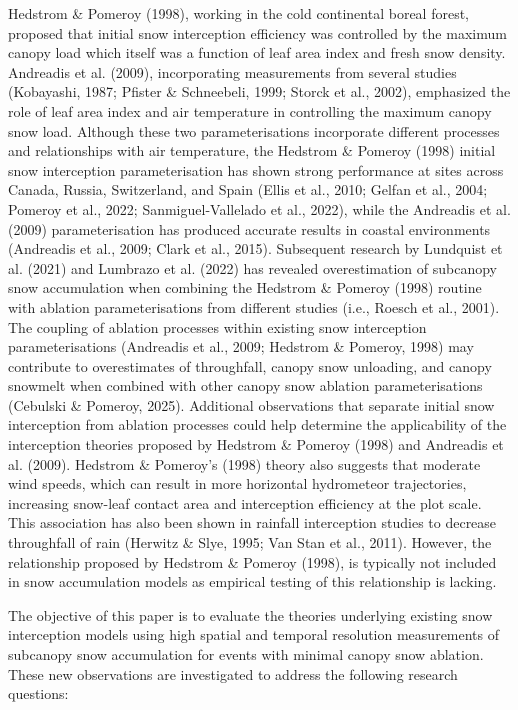 \documentclass[
  letterpaper,
  DIV=11,
  numbers=noendperiod]{scrartcl}
\begin{document}
Hedstrom \& Pomeroy (1998), working in the cold continental boreal
forest, proposed that initial snow interception efficiency was
controlled by the maximum canopy load which itself was a function of
leaf area index and fresh snow density. Andreadis et al. (2009),
incorporating measurements from several studies (Kobayashi, 1987;
Pfister \& Schneebeli, 1999; Storck et al., 2002), emphasized the role
of leaf area index and air temperature in controlling the maximum canopy
snow load. Although these two parameterisations incorporate different
processes and relationships with air temperature, the Hedstrom \&
Pomeroy (1998) initial snow interception parameterisation has shown
strong performance at sites across Canada, Russia, Switzerland, and
Spain (Ellis et al., 2010; Gelfan et al., 2004; Pomeroy et al., 2022;
Sanmiguel-Vallelado et al., 2022), while the Andreadis et al. (2009)
parameterisation has produced accurate results in coastal environments
(Andreadis et al., 2009; Clark et al., 2015). Subsequent research by
Lundquist et al. (2021) and Lumbrazo et al. (2022) has revealed
overestimation of subcanopy snow accumulation when combining the
Hedstrom \& Pomeroy (1998) routine with ablation parameterisations from
different studies (i.e., Roesch et al., 2001). The coupling of ablation
processes within existing snow interception parameterisations (Andreadis
et al., 2009; Hedstrom \& Pomeroy, 1998) may contribute to overestimates
of throughfall, canopy snow unloading, and canopy snowmelt when combined
with other canopy snow ablation parameterisations (Cebulski \& Pomeroy,
2025). Additional observations that separate initial snow interception
from ablation processes could help determine the applicability of the
interception theories proposed by Hedstrom \& Pomeroy (1998) and
Andreadis et al. (2009). Hedstrom \& Pomeroy's (1998) theory also
suggests that moderate wind speeds, which can result in more horizontal
hydrometeor trajectories, increasing snow-leaf contact area and
interception efficiency at the plot scale. This association has also
been shown in rainfall interception studies to decrease throughfall of
rain (Herwitz \& Slye, 1995; Van Stan et al., 2011). However, the
relationship proposed by Hedstrom \& Pomeroy (1998), is typically not
included in snow accumulation models as empirical testing of this
relationship is lacking.

The objective of this paper is to evaluate the theories underlying
existing snow interception models using high spatial and temporal
resolution measurements of subcanopy snow accumulation for events with
minimal canopy snow ablation. These new observations are investigated to
address the following research questions:
\end{document}
